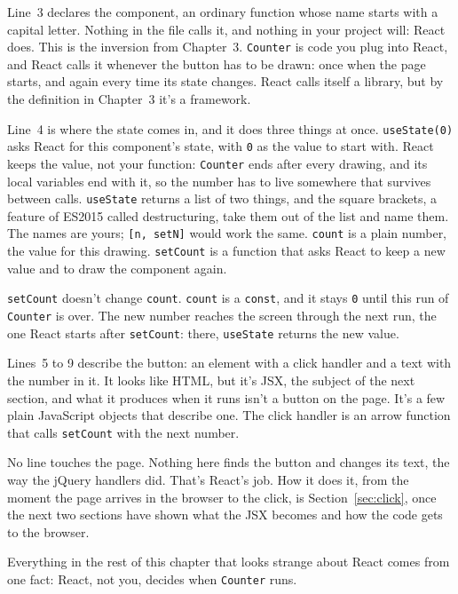 Line~3 declares the component, an ordinary function whose name starts with a
capital letter. Nothing in the file calls it, and nothing in your project will:
React does. This is the inversion from Chapter~3. \texttt{Counter} is code you
plug into React, and React calls it whenever the button has to be drawn: once
when the page starts, and again every time its state changes. React calls
itself a library, but by the definition in Chapter~3 it's a framework.

Line~4 is where the state comes in, and it does three things at once.
\texttt{useState(0)} asks React for this component's state, with \texttt{0} as
the value to start with. React keeps the value, not your function:
\texttt{Counter} ends after every drawing, and its local variables end with it,
so the number has to live somewhere that survives between calls.
\texttt{useState} returns a list of two things, and the square brackets, a
feature of ES2015 called destructuring, take them out of the list and name
them. The names are yours; \texttt{[n, setN]} would work the same.
\texttt{count} is a plain number, the value for this drawing.
\texttt{setCount} is a function that asks React to keep a new value and to draw
the component again.

\texttt{setCount} doesn't change \texttt{count}. \texttt{count} is a
\texttt{const}, and it stays \texttt{0} until this run of \texttt{Counter} is
over. The new number reaches the screen through the next run, the one React
starts after \texttt{setCount}: there, \texttt{useState} returns the new value.

Lines~5 to 9 describe the button: an element with a click handler and a text
with the number in it. It looks like HTML, but it's JSX, the subject of the
next section, and what it produces when it runs isn't a button on the page. It's
a few plain JavaScript objects that describe one. The click handler is an arrow
function that calls \texttt{setCount} with the next number.

No line touches the page. Nothing here finds the button and changes its text,
the way the jQuery handlers did. That's React's job. How it does it, from the
moment the page arrives in the browser to the click, is
Section~\ref{sec:click}, once the next two sections have shown what the JSX
becomes and how the code gets to the browser.

Everything in the rest of this chapter that looks strange about React comes
from one fact: React, not you, decides when \texttt{Counter} runs.

